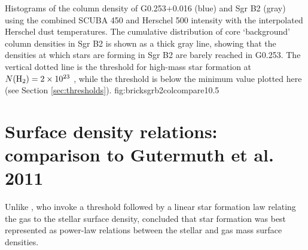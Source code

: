\documentclass[twocolumn]{aastex61}
\begin{document}
{Histograms of the column density of G0.253+0.016 (blue) and Sgr B2 (gray)
using the combined SCUBA 450 \um and Herschel 500 \um intensity with the
interpolated Herschel dust temperatures.  The cumulative distribution of core
`background' column densities in Sgr B2 is shown as a thick gray line, showing
that the densities at which stars are forming in Sgr B2 are barely
reached in G0.253.  The vertical dotted line is the \citet{Krumholz2008a}
threshold for high-mass star formation at $N(\textrm{H}_{2})=2\times10^{23}$ \persc, while
the \citet{Lada2010a} threshold is below the minimum value plotted here (see
Section \ref{sec:thresholds}).}
{fig:bricksgrb2colcompare}{1}{0.5\textwidth}

% 
% 

\section{Surface density relations: comparison to Gutermuth et al. 2011}
\label{sec:gutermuth}
Unlike \citet{Lada2010a}, who invoke a threshold followed by a linear star
formation law relating the gas to the stellar surface density,
\citet{Gutermuth2011a} concluded that star formation was best represented as
power-law relations between the stellar and gas mass surface densities.
\end{document}
